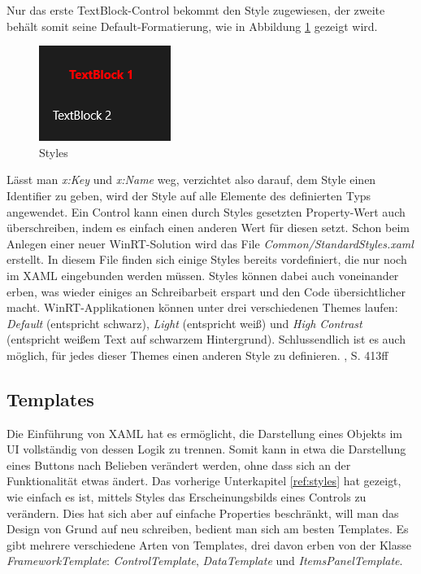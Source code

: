 \documentclass[a4paper,bibtotoc,oneside]{scrbook}
\begin{document}
Nur das erste TextBlock-Control bekommt den Style zugewiesen, der zweite behält somit seine Default-Formatierung, wie in Abbildung \ref{img:styles} gezeigt wird.
\begin{figure}[htbp]
\centering
\includegraphics[scale=1]{images/styles.png}
\caption[Styles]{Styles}\label{img:styles}
\end{figure}
Lässt man \textit{x:Key} und \textit{x:Name} weg, verzichtet also darauf, dem Style einen Identifier zu geben, wird der Style auf alle Elemente des definierten Typs angewendet.
\newline
\newline
Ein Control kann einen durch Styles gesetzten Property-Wert auch überschreiben, indem es einfach einen anderen Wert für diesen setzt.
\newline
\newline
Schon beim Anlegen einer neuer WinRT-Solution wird das File \textit{Common/StandardStyles.xaml} erstellt. In diesem File finden sich einige Styles bereits vordefiniert, die nur noch im XAML eingebunden werden müssen. Styles können dabei auch voneinander erben, was wieder einiges an Schreibarbeit erspart und den Code übersichtlicher macht.
\newline
\newline
WinRT-Applikationen können unter drei verschiedenen Themes laufen: \textit{Default} (entspricht schwarz), \textit{Light} (entspricht weiß) und \textit{High Contrast} (entspricht weißem Text auf schwarzem Hintergrund).
\newline
Schlussendlich ist es auch möglich, für jedes dieser Themes einen anderen Style zu definieren. \cite{ana12}, S. 413ff

\subsection[Templates]{Templates}
Die Einführung von XAML hat es ermöglicht, die Darstellung eines Objekts im UI vollständig von dessen Logik zu trennen. Somit kann in etwa die Darstellung eines Buttons nach Belieben verändert werden, ohne dass sich an der Funktionalität etwas ändert.
\newline
Das vorherige Unterkapitel \ref{ref:styles} hat gezeigt, wie einfach es ist, mittels Styles das Erscheinungsbilds eines Controls zu verändern. Dies hat sich aber auf einfache Properties beschränkt, will man das Design von Grund auf neu schreiben, bedient man sich am besten Templates.
\newline
\newline
Es gibt mehrere verschiedene Arten von Templates, drei davon erben von der Klasse \textit{FrameworkTemplate}: \textit{ControlTemplate}, \textit{DataTemplate} und \textit{ItemsPanelTemplate}.
\end{document}
